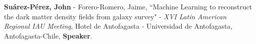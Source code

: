 \documentclass[10pt, a4paper]{article}
\newcommand{\years}[1]{\marginnote{\scriptsize #1}}
\begin{document}



\years{2019}\textbf{Suárez-Pérez, John} - Forero-Romero, Jaime, “Machine Learning to reconstruct the dark matter density fields from galaxy survey" - \emph{XVI Latin American Regional IAU Meeting}, Hotel de Antofagasta - Universidad de Antofagasta, Antofagasta-Chile, \textbf{Speaker}.\\




\end{document}
